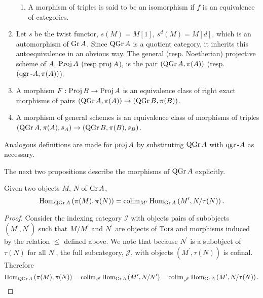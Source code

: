 \documentclass[dissertation.tex]{subfiles}
\begin{document}
\begin{defn}
\begin{enumerate}
\begin{enumerate}
    \item
      A morphism of triples is said to be an isomorphism if $f$ is an equivalence of categories.
    \end{enumerate}
  \item
    Let $s$ be the twist functor, $s(M) = M[1]$, $s^d(M) = M[d]$, which is an automorphism of $\operatorname{Gr}A$.
    Since $\operatorname{QGr}A$ is a quotient category, it inherits this autoequivalence in an obvious way.
    The general (resp. Noetherian) projective scheme of $A$, $\operatorname{Proj} A$ (resp $\operatorname{proj} A$), is the pair $(\operatorname{QGr}A, \pi(A))$ (resp. $(\operatorname{qgr}\text{-}A, \pi(A))$).
  \item
    A morphism $F :\operatorname{Proj} B \rightarrow \operatorname{Proj} A$ is an equivalence class of right exact morphisms of pairs $(\operatorname{QGr}A, \pi(A)) \rightarrow (\operatorname{QGr}B, \pi(B))$.
  \item
    A morphism of general schemes is an equivalence class of morphisms of triples $(\operatorname{QGr}A, \pi(A), s_A) \rightarrow (\operatorname{QGr}B, \pi(B), s_B)$.
  \end{enumerate}
  Analogous definitions are made for $\operatorname{proj} A$ by substituting $\operatorname{QGr}A$ with $\operatorname{qgr}\text{-}A$ as necessary.
\end{defn}

The next two propositions describe the morphisms of $\operatorname{QGr}A$ explicitly.

\begin{prop}
  Given two objects $M$, $N$ of $\operatorname{Gr}A$, 
  $$\operatorname{Hom}_{\operatorname{QGr}A}\left(\pi(M), \pi(N)\right) = \operatorname{colim}_{M^\prime}\operatorname{Hom}_{\operatorname{Gr}A}\left(M^\prime, N/\tau(N)\right).$$
  
  \begin{proof}
    Consider the indexing category $\mathscr{I}$ with objects pairs of subobjects $(M^\prime, N^\prime)$ such that $M/M^\prime$ and $N^\prime$ are objects of $\Tors$ and morphisms induced by the relation $\leq$ defined above.
    We note that because $N^\prime$ is a subobject of $\tau(N)$ for all $N^\prime$, the full subcategory, $\mathscr{J}$, with objects $(M^\prime, \tau(N))$ is cofinal.
    Therefore
    $$\operatorname{Hom}_{\operatorname{QGr}A}\left(\pi(M), \pi(N)\right) = \operatorname{colim}_{\mathscr{I}}\operatorname{Hom}_{\operatorname{Gr}A}\left(M^\prime, N/N^\prime\right) = \operatorname{colim}_{\mathscr{J}}\operatorname{Hom}_{\operatorname{Gr}A}\left(M^\prime, N/\tau(N)\right).$$
  \end{proof}
\end{prop}
\end{document}
